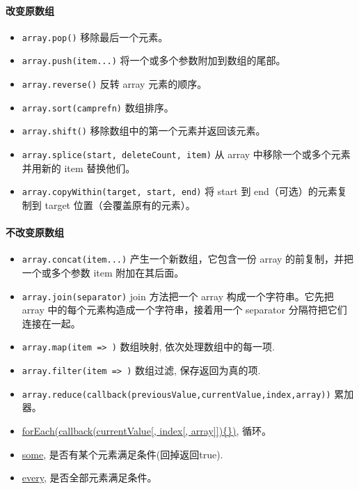 \paragraph{改变原数组}\label{ux6539ux53d8ux539fux6570ux7ec4}

\begin{itemize}
\tightlist
\item
  \lstinline!array.pop()! 移除最后一个元素。
\item
  \lstinline!array.push(item...)! 将一个或多个参数附加到数组的尾部。
\item
  \lstinline!array.reverse()! 反转 array 元素的顺序。
\item
  \lstinline!array.sort(camprefn)! 数组排序。
\item
  \lstinline!array.shift()! 移除数组中的第一个元素并返回该元素。
\item
  \lstinline!array.splice(start, deleteCount, item)! 从 array
  中移除一个或多个元素并用新的 item 替换他们。
\item
  \lstinline!array.copyWithin(target, start, end)! 将 start 到
  end（可选）的元素复制到 target 位置（会覆盖原有的元素）。
\end{itemize}

\paragraph{不改变原数组}\label{ux4e0dux6539ux53d8ux539fux6570ux7ec4}

\begin{itemize}
\tightlist
\item
  \lstinline!array.concat(item...)! 产生一个新数组，它包含一份 array
  的前复制，并把一个或多个参数 item 附加在其后面。
\item
  \lstinline!array.join(separator)! join 方法把一个 array
  构成一个字符串。它先把 array 中的每个元素构造成一个字符串，接着用一个
  separator 分隔符把它们连接在一起。
\item
  \lstinline!array.map(item => )! 数组映射, 依次处理数组中的每一项.
\item
  \lstinline!array.filter(item => )! 数组过滤, 保存返回为真的项.
\item
  \lstinline!array.reduce(callback(previousValue,currentValue,index,array))!
  累加器。
\item
  \href{https://developer.mozilla.org/en-US/docs/Web/JavaScript/Reference/Global_Objects/Array/forEach}{forEach(callback(currentValue{[},
  index{[}, array{]}{]})\{\})}, 循环。
\item
  \href{https://developer.mozilla.org/en-US/docs/Web/JavaScript/Reference/Global_Objects/Array/some}{some},
  是否有某个元素满足条件(回掉返回true).
\item
  \href{https://developer.mozilla.org/en-US/docs/Web/JavaScript/Reference/Global_Objects/Array/every}{every},
  是否全部元素满足条件。
\end{itemize}

